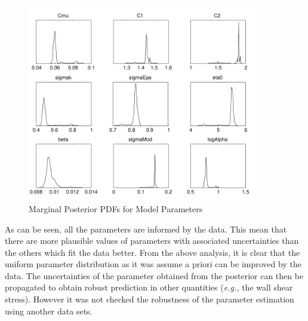 \documentclass[11pt,titlepage]{article}
\begin{document}
\begin{figure}[htbp]
	\centering
	\includegraphics[width=0.9\textwidth]{ParamEstCorrDRAM.pdf}
	\caption{Marginal Posterior PDFs for Model Parameters}
	\label{fig:MarginalPosteriorPDFsForModelParameters}
\end{figure}
As can be seen, all the parameters are informed by the data. 
This mean that there are more plausible values of parameters with associated uncertainties than the others which fit the data better. 
From the above analysis, it is clear that the uniform parameter distribution as it was assume a priori can be improved by the data.
The uncertainties of the parameter obtained from the posterior can then be propagated to obtain robust prediction in other quantities (\textit{e.g.,} the wall shear stress). 
However it was not checked the robustness of the parameter estimation using another data sets. 
\end{document}
